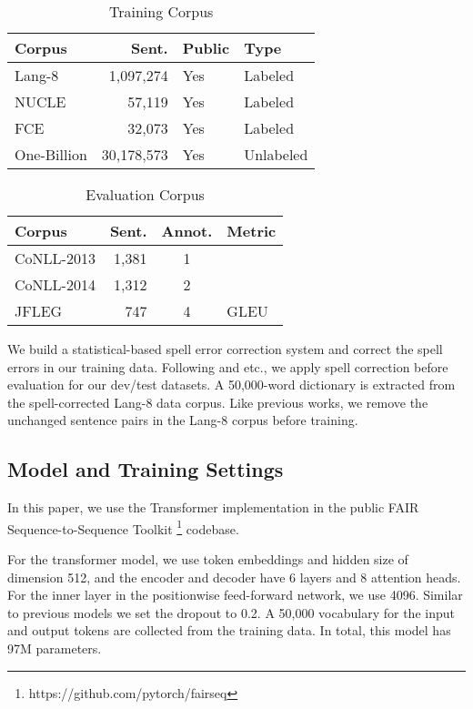 \documentclass[11pt,a4paper]{article}
\begin{document}
\begin{table}[t!]
\begin{center}
\begin{tabular}{|l|r|l|l|}
\hline \bf Corpus & \bf Sent. & \bf Public & \bf Type \\ \hline
Lang-8 & 1,097,274 & Yes & Labeled \\
NUCLE & 57,119 & Yes & Labeled \\
FCE & 32,073 & Yes & Labeled \\
\hline
One-Billion & 30,178,573 & Yes & Unlabeled \\
\hline
\end{tabular}
\end{center}
\caption{\label{train_data} Training Corpus}
\end{table}

\begin{table}[t!]
\begin{center}
\begin{tabular}{|l|r|c|l|}
\hline \bf Corpus & \bf Sent. & \bf Annot. & \bf Metric \\ \hline
CoNLL-2013 & 1,381 & 1 &  \\
CoNLL-2014 & 1,312 & 2 &  \\
JFLEG & 747 & 4 & GLEU \\
\hline
\end{tabular}
\end{center}
\caption{\label{test_data} Evaluation Corpus}
\end{table}

We build a statistical-based spell error correction system and correct the spell errors in our training data. Following \cite{ge2018reaching,junczys2018approaching,chollampatt2018multilayer} and etc., we apply spell correction before evaluation for our dev/test datasets. A 50,000-word dictionary is extracted from the spell-corrected Lang-8 data corpus. Like previous works, we remove the unchanged sentence pairs in the Lang-8 corpus before training. 


\subsection{Model and Training Settings}
In this paper, we use the Transformer implementation in the public FAIR Sequence-to-Sequence Toolkit \footnote{https://github.com/pytorch/fairseq} \cite{gehring2017convolutional} codebase. 

For the transformer model, we use token embeddings and hidden size of dimension 512, and the encoder and decoder have 6 layers and 8 attention heads. For the inner layer in the positionwise feed-forward network, we use 4096. Similar to previous models we set the dropout to 0.2. A 50,000 vocabulary for the input and output tokens are collected from the training data. In total, this model has 97M parameters.
\end{document}
